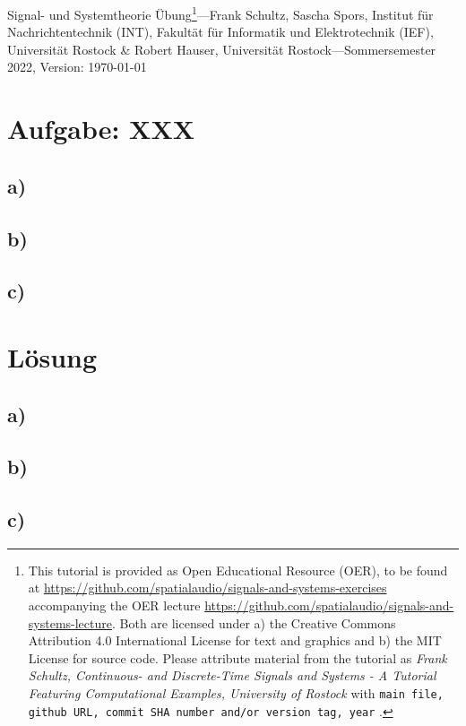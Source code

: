 \documentclass[11pt,a4paper,DIV=12]{scrartcl}
\begin{document}
%
\noindent Signal- und Systemtheorie Übung\footnote{This tutorial is provided as
Open Educational Resource (OER), to be found at
\url{https://github.com/spatialaudio/signals-and-systems-exercises}
accompanying the OER lecture
\url{https://github.com/spatialaudio/signals-and-systems-lecture}.
%
Both are licensed under a) the Creative Commons Attribution 4.0 International
License for text and graphics and b) the MIT License for source code.
%
Please attribute material from the tutorial as \textit{Frank Schultz,
Continuous- and Discrete-Time Signals and Systems - A Tutorial Featuring
Computational Examples, University of Rostock} with
\texttt{main file, github URL, commit SHA number and/or version tag, year}
.}---Frank Schultz, Sascha Spors,
Institut für Nachrichtentechnik (INT),
Fakultät für Informatik und Elektrotechnik (IEF),
Universität Rostock \&
Robert Hauser, Universität Rostock---Sommersemester 2022, Version: \today
%
%

\section*{Aufgabe: XXX}
\vspace{-0.4cm}{\tiny 41B4F6D3A2} %
%
%
%
\subsection*{a)}
\subsection*{b)}
\subsection*{c)}
%
%
%
\section*{Lösung}
%
%
%
\subsection*{a)}
\subsection*{b)}
\subsection*{c)}
%
%
%



\renewcommand{\refname}{Buchzitate}
\cite{Strang2007,Strang2010}
\clearpage

\end{document}
